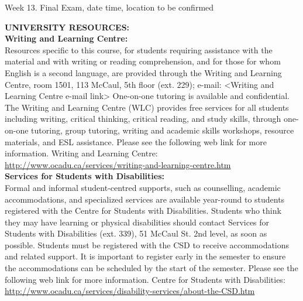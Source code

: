 \documentclass[10pt]{article}
\begin{document}


Week 13. Final Exam, date time, location to be confirmed


\textbf{UNIVERSITY RESOURCES:}\\
\textbf{Writing and Learning Centre:}\\
Resources specific to this course, for students requiring assistance with the material and with writing or reading comprehension, and for those for whom English is a second language, are provided through the Writing and Learning Centre, room 1501, 113 McCaul, 5th floor (ext. 229); e-mail: <Writing and Learning Centre e-mail link>  One-on-one tutoring is available and confidential.  The Writing and Learning Centre (WLC) provides free services for all students including writing, critical thinking, critical reading, and study skills, through one-on-one tutoring, group tutoring, writing and academic skills workshops, resource materials, and ESL assistance.  Please see the following web link for more information. Writing and Learning Centre: \url{http://www.ocadu.ca/services/writing-and-learning-centre.htm} \\
%
\textbf{Services for Students with Disabilities:}\\
Formal and informal student-centred supports, such as counselling, academic accommodations, and specialized services are available year-round to students registered with the Centre for Students with Disabilities. Students who think they may have learning or physical disabilities should contact Services for Students with Disabilities (ext. 339), 51 McCaul St. 2nd level, as soon as possible. Students must be registered with the CSD to receive accommodations and related support. It is important to register early in the semester to ensure the accommodations can be scheduled by the start of the semester.  Please see the following web link for more information. Centre for Students with Disabilities: \url{http://www.ocadu.ca/services/disability-services/about-the-CSD.htm} \\
\end{document}
